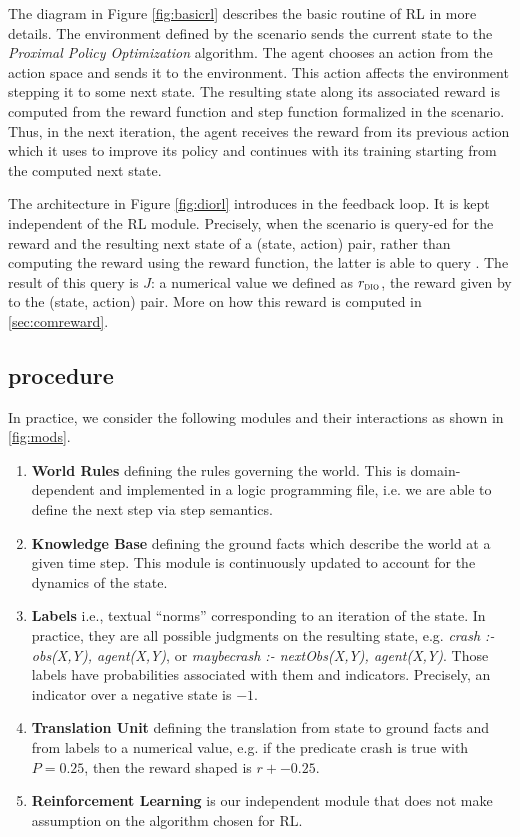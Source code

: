 The diagram in Figure \ref{fig:basicrl} describes the basic routine of RL in more details. The environment defined by the scenario sends the current state 
to the \emph{Proximal Policy Optimization} algorithm. The agent chooses an action from the action space and sends it to the environment. This action affects the environment stepping it to some next state. 
The resulting state along its associated reward is computed from the reward function and step function formalized in the scenario. Thus, in the next iteration, the 
agent receives the reward from its previous action which it uses to improve its policy and continues with its training starting from the computed next state.  

The architecture in Figure \ref{fig:diorl} introduces \dio{} in the feedback loop. It is kept independent of the RL module. Precisely, when the scenario is query-ed for the reward and 
the resulting next state of a (state, action) pair, rather than computing the reward using the reward function, the latter is able to query \dio{}. The result of this query is $J$: a numerical value 
we defined as $r_{\textsc{dio}}{}$, the reward given by \dio{} to the (state, action) pair. More on how this reward is computed in \ref{sec:comreward}.
 

\subsection{\dio{} procedure}
\label{sec:modules}
In practice, we consider the following modules and their interactions as shown in \ref{fig:mods}.


\begin{multicols}{2}
\begin{enumerate}
  \item \textbf{World Rules} defining the rules governing the world. This is domain-dependent and implemented 
        in a logic programming file, i.e. we are able to define the next step via step semantics.
  \item \textbf{Knowledge Base} defining the ground facts which describe the world at a given time step. This module is 
        continuously updated to account for the dynamics of the
        state.
  \item \textbf{Labels} i.e., textual ``norms'' corresponding to an
  iteration of the state. In practice, they are all possible judgments on the resulting state, e.g. \textit{crash :- obs(X,Y), agent(X,Y)}, 
                  or \textit{maybecrash :- nextObs(X,Y), agent(X,Y)}. 
                    Those labels have probabilities associated with
                    them and indicators. Precisely, an indicator over a negative state is $-1$. 
  \item \textbf{Translation Unit} defining the translation from state to ground facts and from labels to a numerical value, e.g. if the predicate crash is true with $P = 0.25$, then the reward shaped is $r + -0.25$. 
  \item \textbf{Reinforcement Learning} is our independent module that does not make assumption on the algorithm chosen for RL.
\end{enumerate}
\end{multicols}


